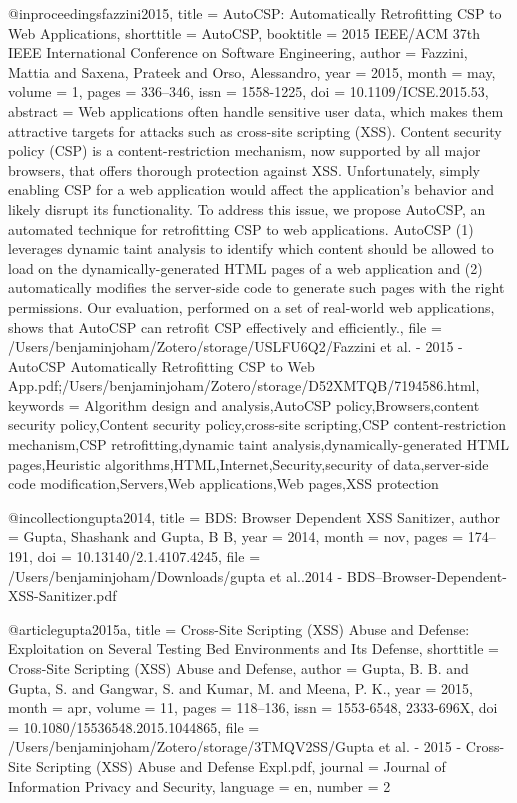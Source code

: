 @inproceedings{fazzini2015,
  title = {{{AutoCSP}}: {{Automatically Retrofitting CSP}} to {{Web Applications}}},
  shorttitle = {{{AutoCSP}}},
  booktitle = {2015 {{IEEE}}/{{ACM}} 37th {{IEEE International Conference}} on {{Software Engineering}}},
  author = {Fazzini, Mattia and Saxena, Prateek and Orso, Alessandro},
  year = {2015},
  month = may,
  volume = {1},
  pages = {336--346},
  issn = {1558-1225},
  doi = {10.1109/ICSE.2015.53},
  abstract = {Web applications often handle sensitive user data, which makes them attractive targets for attacks such as cross-site scripting (XSS). Content security policy (CSP) is a content-restriction mechanism, now supported by all major browsers, that offers thorough protection against XSS. Unfortunately, simply enabling CSP for a web application would affect the application's behavior and likely disrupt its functionality. To address this issue, we propose AutoCSP, an automated technique for retrofitting CSP to web applications. AutoCSP (1) leverages dynamic taint analysis to identify which content should be allowed to load on the dynamically-generated HTML pages of a web application and (2) automatically modifies the server-side code to generate such pages with the right permissions. Our evaluation, performed on a set of real-world web applications, shows that AutoCSP can retrofit CSP effectively and efficiently.},
  file = {/Users/benjaminjoham/Zotero/storage/USLFU6Q2/Fazzini et al. - 2015 - AutoCSP Automatically Retrofitting CSP to Web App.pdf;/Users/benjaminjoham/Zotero/storage/D52XMTQB/7194586.html},
  keywords = {Algorithm design and analysis,AutoCSP policy,Browsers,content security policy,Content security policy,cross-site scripting,CSP content-restriction mechanism,CSP retrofitting,dynamic taint analysis,dynamically-generated HTML pages,Heuristic algorithms,HTML,Internet,Security,security of data,server-side code modification,Servers,Web applications,Web pages,XSS protection}
}

@incollection{gupta2014,
  title = {{{BDS}}: {{Browser Dependent XSS Sanitizer}}},
  author = {Gupta, Shashank and Gupta, B B},
  year = {2014},
  month = nov,
  pages = {174--191},
  doi = {10.13140/2.1.4107.4245},
  file = {/Users/benjaminjoham/Downloads/gupta et al..2014 - BDS--Browser-Dependent-XSS-Sanitizer.pdf}
}

@article{gupta2015a,
  title = {Cross-{{Site Scripting}} ({{XSS}}) {{Abuse}} and {{Defense}}: {{Exploitation}} on {{Several Testing Bed Environments}} and {{Its Defense}}},
  shorttitle = {Cross-{{Site Scripting}} ({{XSS}}) {{Abuse}} and {{Defense}}},
  author = {Gupta, B. B. and Gupta, S. and Gangwar, S. and Kumar, M. and Meena, P. K.},
  year = {2015},
  month = apr,
  volume = {11},
  pages = {118--136},
  issn = {1553-6548, 2333-696X},
  doi = {10.1080/15536548.2015.1044865},
  file = {/Users/benjaminjoham/Zotero/storage/3TMQV2SS/Gupta et al. - 2015 - Cross-Site Scripting (XSS) Abuse and Defense Expl.pdf},
  journal = {Journal of Information Privacy and Security},
  language = {en},
  number = {2}
}

